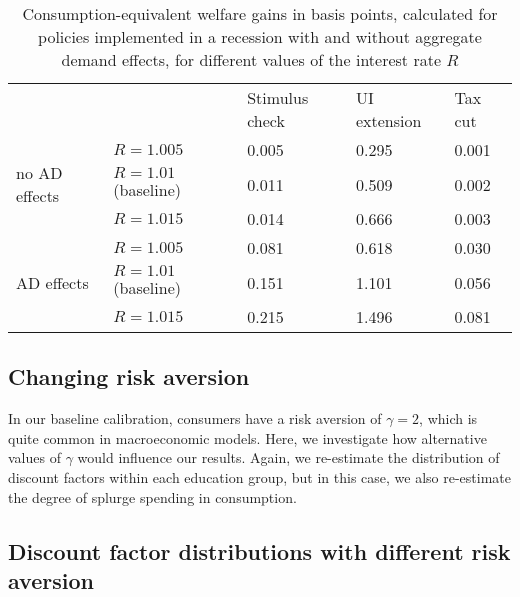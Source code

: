 \documentclass[\latexroot/\projectname]{subfiles}
\begin{document}
\begin{table}[t]
  \begin{center}
    \begin{tabular}
      {@{}lllll@{}}
      \toprule
                                     &                       & Stimulus check & UI extension & Tax cut \\ \cmidrule(l){1-5}
      \multirow{3}{*}{no AD effects} & $R = 1.005$           & 0.005          & 0.295        & 0.001   \\
                                     & $R = 1.01$ (baseline) & 0.011          & 0.509        & 0.002   \\
                                     & $R = 1.015$           & 0.014          & 0.666        & 0.003   \\ \cmidrule(l){1-5}
      \multirow{3}{*}{AD effects}    & $R = 1.005$           & 0.081          & 0.618        & 0.030   \\
                                     & $R = 1.01$ (baseline) & 0.151          & 1.101        & 0.056   \\
                                     & $R = 1.015$           & 0.215          & 1.496        & 0.081   \\ \cmidrule(l){1-5}
    \end{tabular}
    \caption{Consumption-equivalent welfare gains in basis points, calculated for policies implemented in a recession with and without aggregate demand effects, for different values of the interest rate $R$}
    \whenintegrated{\label{tab:robustness_R_results}} 
  \end{center}
\end{table}

\FloatBarrier
\hypertarget{changing-risk-aversion}{}\par\subsection*{Changing risk aversion}
\whenintegrated{\label{sec:robust_gamma}} 

In our baseline calibration, consumers have a risk aversion of $\gamma=2$, which is quite common in macroeconomic models.
Here, we investigate how alternative values of $\gamma$ would influence our results.
Again, we re-estimate the distribution of discount factors within each education group, but in this case, we also re-estimate the degree of splurge spending in consumption.

\subsection*{Discount factor distributions with different risk aversion}
\whenintegrated{\label{sec:robust_gamma_estim}} 
\end{document}
